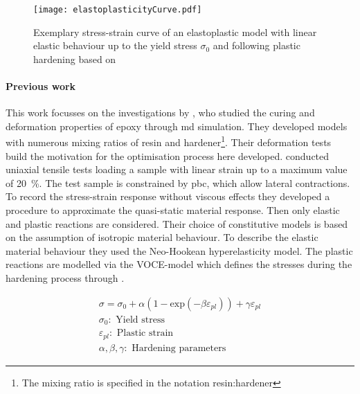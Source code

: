 \begin{figure}[H]
    \centering
    \texttt{[image: elastoplasticityCurve.pdf]}
    \caption{Exemplary stress-strain curve of an elastoplastic model with linear elastic behaviour up to the yield stress $\sigma_0$ and following plastic hardening based on \cite{mergheim_lecture_nodate}}
    \label{fig:elastoplasticityCurve}
\end{figure}




\paragraph{Previous work}
This work focusses on the investigations by \citet{ries_deciphering_nodate}, who studied the curing and deformation properties of epoxy through \acrshort{md} simulation. They developed models with numerous mixing ratios of resin and hardener\footnote{The mixing ratio is specified in the notation resin:hardener}. Their deformation tests build the motivation for the optimisation process here developed. \citet{ries_deciphering_nodate} conducted uniaxial tensile tests loading a sample with linear strain up to a maximum value of 20 \%. The test sample is constrained by \acrshort{pbc}, which allow lateral contractions. To record the stress-strain response without viscous effects they developed a procedure to approximate the quasi-static material response. Then only elastic and plastic reactions are considered. Their choice of constitutive models is based on the assumption of isotropic material behaviour. To describe the elastic material behaviour they used the Neo-Hookean hyperelasticity model. The plastic reactions are modelled via the VOCE-model which defines the stresses during the hardening process through \cite{voce_practical_1948}.


\begin{gather} 
    \sigma = \sigma_0 + \alpha(1 - \text{exp}(-\beta \varepsilon_{pl})) + \gamma \varepsilon_{pl} \label{eq: voce} \\ 
    \sigma_0: \text{ Yield stress} \nonumber\\
    \varepsilon_{pl}: \text{ Plastic strain} \nonumber \\
    \alpha, \beta,  \gamma: \text{ Hardening parameters} \nonumber
\end{gather}


